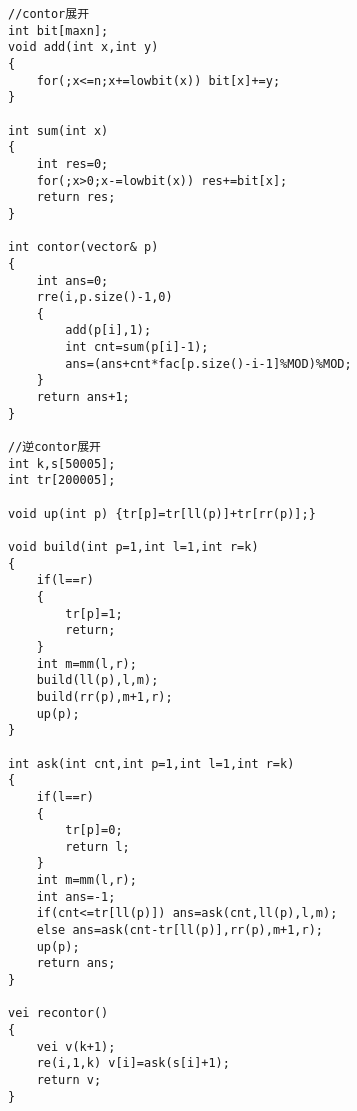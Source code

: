 \begin{lstlisting}
//contor展开
int bit[maxn];
void add(int x,int y)
{
    for(;x<=n;x+=lowbit(x)) bit[x]+=y; 
} 

int sum(int x)
{
    int res=0;
    for(;x>0;x-=lowbit(x)) res+=bit[x];
    return res;
}

int contor(vector& p)
{
    int ans=0;
    rre(i,p.size()-1,0)
    {
        add(p[i],1);
        int cnt=sum(p[i]-1);
        ans=(ans+cnt*fac[p.size()-i-1]%MOD)%MOD;
    }
    return ans+1;
}

//逆contor展开
int k,s[50005];
int tr[200005];

void up(int p) {tr[p]=tr[ll(p)]+tr[rr(p)];}

void build(int p=1,int l=1,int r=k)
{
    if(l==r)
    {
        tr[p]=1;
        return;
    }
    int m=mm(l,r);
    build(ll(p),l,m);
    build(rr(p),m+1,r);
    up(p);
}

int ask(int cnt,int p=1,int l=1,int r=k)
{
    if(l==r)
    {
        tr[p]=0;
        return l;
    }
    int m=mm(l,r);
    int ans=-1;
    if(cnt<=tr[ll(p)]) ans=ask(cnt,ll(p),l,m);
    else ans=ask(cnt-tr[ll(p)],rr(p),m+1,r);
    up(p);
    return ans;
}

vei recontor()
{
    vei v(k+1);
    re(i,1,k) v[i]=ask(s[i]+1);
    return v;
}
\end{lstlisting}